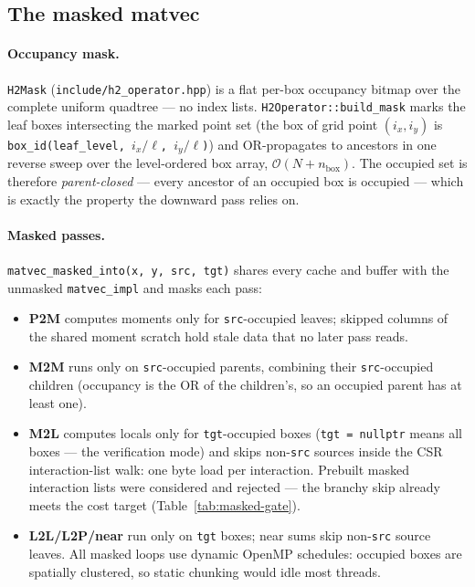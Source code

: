 \documentclass[11pt,a4paper]{article}
\newcommand{\Order}{\mathcal{O}}
\newcommand{\code}[1]{\texttt{#1}}
\theoremstyle{definition}
\theoremstyle{remark}
\begin{document}
\subsection{The masked matvec}
\label{sec:masked}

\paragraph{Occupancy mask.} \code{H2Mask} (\code{include/h2\_operator.hpp})
is a flat per-box occupancy bitmap over the complete uniform quadtree ---
no index lists. \code{H2Operator::build\_mask} marks the leaf boxes
intersecting the marked point set (the box of grid point $(i_x,i_y)$ is
\code{box\_id(leaf\_level, $i_x/\ell$, $i_y/\ell$)}) and OR-propagates to
ancestors in one reverse sweep over the level-ordered box array,
$\Order(N+n_{\text{box}})$. The occupied set is therefore
\emph{parent-closed} --- every ancestor of an occupied box is occupied ---
which is exactly the property the downward pass relies on.

\paragraph{Masked passes.} \code{matvec\_masked\_into(x, y, src, tgt)}
shares every cache and buffer with the unmasked \code{matvec\_impl} and
masks each pass:
\begin{itemize}
\item \textbf{P2M} computes moments only for \code{src}-occupied leaves;
skipped columns of the shared moment scratch hold stale data that no later
pass reads.
\item \textbf{M2M} runs only on \code{src}-occupied parents, combining
their \code{src}-occupied children (occupancy is the OR of the children's,
so an occupied parent has at least one).
\item \textbf{M2L} computes locals only for \code{tgt}-occupied boxes
(\code{tgt = nullptr} means all boxes --- the verification mode) and skips
non-\code{src} sources inside the CSR interaction-list walk: one byte load
per interaction. Prebuilt masked interaction lists were considered and
rejected --- the branchy skip already meets the cost target
(Table~\ref{tab:masked-gate}).
\item \textbf{L2L/L2P/near} run only on \code{tgt} boxes; near sums skip
non-\code{src} source leaves. All masked loops use dynamic OpenMP schedules:
occupied boxes are spatially clustered, so static chunking would idle most
threads.
\end{itemize}
\end{document}
